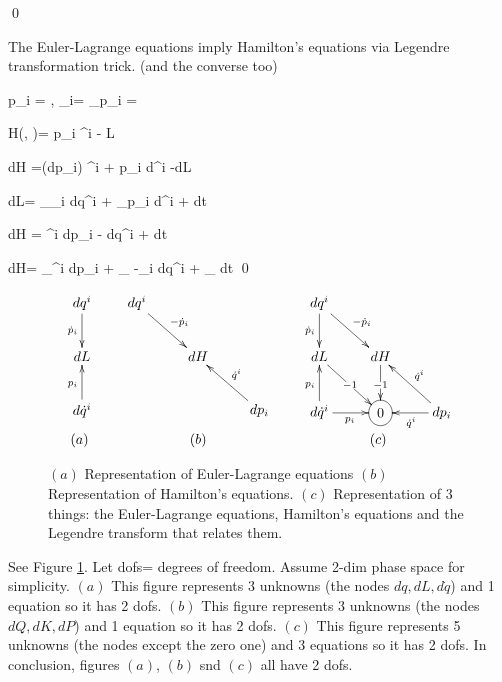 \qed

\begin{claim}
The Euler-Lagrange equations imply Hamilton's equations via Legendre transformation trick. (and the converse too)
\end{claim}
\proof



\beq
p_i =
,\quad
{}_i=
_{p_i}
= 
\eeq

\beq H(\vecq, \vecp)=
p_i ^i -
L
\eeq

\beq
dH =(dp_i) ^i +
p_i d^i
-dL
\eeq

\beq
dL= 
_{_i}
dq^i
+ _{p_i}
d^i
+
 dt
\eeq

\beq
dH =
^i dp_i 
-
dq^i
+
dt
\eeq

\beq
dH=
_{^i}
dp_i
+
_
{-_i}
dq^i
+
_{}
dt
\eeq
\qed



\begin{figure}[h!]
$$\begin{array}{ccc}
\xymatrix{
dq^i 
\ar[d]_{\dot{p}_i}
\\
dL 
\\
d\dot{q}^i
\ar[u]^{p_i}
}
&
\quad
\xymatrix{
dq^i 
\ar[dr]^{-\dot{p}_i}
&&
\\
&dH
&
\\
&
&dp_i
\ar[lu]_{\dot{q}^i}
}
\quad
&
\xymatrix{
dq^i 
\ar[d]_{\dot{p}_i}
\ar[dr]^{-\dot{p}_i}
&&
\\
dL \ar[rd]|{-1}
&dH
\ar[d]|{-1}
&
\\
d\dot{q}^i
\ar[u]^{p_i}
\ar[r]_{p_i}
&\Circle{0}
&dp_i
\ar[lu]_{\dot{q}^i}
\ar[l]^{\dot{q}^i}
}
\\
(a)&(b)&(c)
\end{array}
$$
\caption{$(a)$ Representation of
Euler-Lagrange equations
$(b)$ Representation of Hamilton's equations.
$(c)$ Representation of 3 things: the Euler-Lagrange equations, Hamilton's equations
and the Legendre transform
that relates them.
}
\label{fig-L-H-legendre-trans}
\end{figure}

See Figure \ref{fig-L-H-legendre-trans}.
Let dofs=  degrees of freedom.
Assume 2-dim phase space for simplicity. $(a)$ This figure represents 3 unknowns (the nodes $dq, dL, d\dot{q}$) and 1 equation so it has 2 dofs.
$(b)$  This figure represents 3 unknowns (the nodes $dQ, dK, dP$) and 1 equation so it has 2 dofs. $(c)$ 
This figure represents 5 unknowns (the nodes except the zero one) and 3 equations so it has 2 dofs. In conclusion,
figures $(a)$, $(b)$ snd $(c)$ all have 2 dofs.


